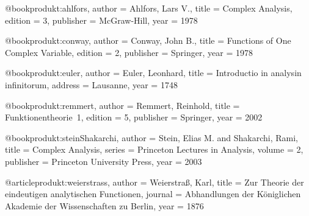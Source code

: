 @book{produkt:ahlfors,
author    = {Ahlfors, Lars V.},
title     = {Complex Analysis},
edition   = {3},
publisher = {McGraw-Hill},
year      = {1978}
}

@book{produkt:conway,
author    = {Conway, John B.},
title     = {Functions of One Complex Variable},
edition   = {2},
publisher = {Springer},
year      = {1978}
}

@book{produkt:euler,
author    = {Euler, Leonhard},
title     = {Introductio in analysin infinitorum},
address   = {Lausanne},
year      = {1748}
}

@book{produkt:remmert,
author    = {Remmert, Reinhold},
title     = {Funktionentheorie~1},
edition   = {5},
publisher = {Springer},
year      = {2002}
}

@book{produkt:steinShakarchi,
author    = {Stein, Elias M. and Shakarchi, Rami},
title     = {Complex Analysis},
series    = {Princeton Lectures in Analysis},
volume    = {2},
publisher = {Princeton University Press},
year      = {2003}
}

@article{produkt:weierstrass,
author  = {Weierstraß, Karl},
title   = {Zur Theorie der eindeutigen analytischen Functionen},
journal = {Abhandlungen der Königlichen Akademie der Wissenschaften zu Berlin},
year    = {1876}
}